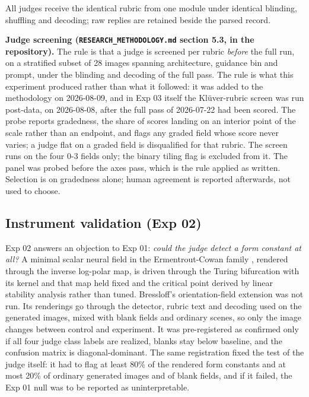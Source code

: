 \documentclass[11pt]{article}
\begin{document}
All judges receive the identical rubric from one module under identical
blinding, shuffling and decoding; raw replies are retained beside the parsed
record.

\textbf{Judge screening (\texttt{RESEARCH\_METHODOLOGY.md} section 5.3, in the
repository).} The rule is that a judge is screened per rubric \emph{before} the
full run, on a stratified subset of 28 images spanning architecture, guidance
bin and prompt, under the blinding and decoding of the full pass. The rule is
what this experiment produced rather than what it followed: it was added to the
methodology on 2026-08-09, and in Exp 03 itself the Klüver-rubric screen was run
post-data, on 2026-08-08, after the full pass of 2026-07-22 had been scored. The
probe reports gradedness, the share of scores landing on an interior point of
the scale rather than an endpoint, and flags any graded field whose score never
varies; a judge flat on a graded field is disqualified for that rubric. The
screen runs on the four 0-3 fields only; the binary tiling flag is excluded from
it. The panel was probed before the axes pass, which is the rule applied as
written. Selection is on gradedness alone; human agreement is reported
afterwards, not used to choose.

\subsection{Instrument validation (Exp 02)}\label{instrument-validation-exp-02}

Exp 02 answers an objection to Exp 01: \emph{could the judge detect a form
constant at all?} A minimal scalar neural field in the Ermentrout-Cowan family
\citep{ermentrout1979}, rendered through the inverse log-polar map, is driven
through the Turing bifurcation with its kernel and that map held fixed and the
critical point derived by linear stability analysis rather than tuned.
Bressloff's orientation-field extension \citep{bressloff2001} was not run. Its
renderings go through the detector, rubric text and decoding used on the
generated images, mixed with blank fields and ordinary scenes, so only the image
changes between control and experiment. It was pre-registered as confirmed only
if all four judge class labels are realized, blanks stay below baseline, and the
confusion matrix is diagonal-dominant. The same registration fixed the test of
the judge itself: it had to flag at least 80\% of the rendered form constants
and at most 20\% of ordinary generated images and of blank fields, and if it
failed, the Exp 01 null was to be reported as uninterpretable.
\end{document}
